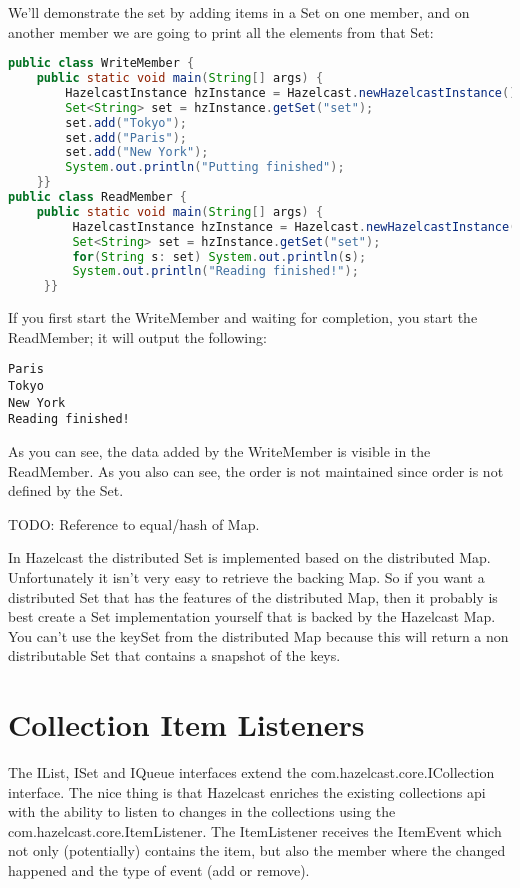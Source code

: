 We'll demonstrate the set by adding items in a Set on one member, and on another member we are going to print all the elements from that Set:
\begin{lstlisting}[language=java]
public class WriteMember {
    public static void main(String[] args) {
        HazelcastInstance hzInstance = Hazelcast.newHazelcastInstance();
        Set<String> set = hzInstance.getSet("set");
        set.add("Tokyo");
        set.add("Paris");
        set.add("New York");
        System.out.println("Putting finished");
    }}
public class ReadMember {
    public static void main(String[] args) {
         HazelcastInstance hzInstance = Hazelcast.newHazelcastInstance();
         Set<String> set = hzInstance.getSet("set");
         for(String s: set) System.out.println(s);
         System.out.println("Reading finished!");
     }}
\end{lstlisting}
If you first start the WriteMember and waiting for completion, you start the ReadMember; it will output the following:
\begin{lstlisting}
Paris
Tokyo
New York
Reading finished!	
\end{lstlisting}
As you can see, the data added by the WriteMember is visible in the ReadMember. As you also can see, the order is not maintained since order is not defined by the Set.

TODO: Reference to equal/hash of Map.

In Hazelcast the distributed Set is implemented based on the distributed Map. Unfortunately it isn't very easy to retrieve the backing Map. So if you want a distributed Set that has the features of the distributed Map, then it probably is best create a Set implementation yourself that is backed by the Hazelcast Map. You can't use the keySet from the distributed Map because this will return a non distributable Set that contains a snapshot of the keys.

\section{Collection Item Listeners}
The IList, ISet and IQueue interfaces extend the com.hazelcast.core.ICollection interface. The nice thing is that Hazelcast enriches the existing collections api with the ability to listen to changes in the collections using the com.hazelcast.core.ItemListener. The ItemListener receives the ItemEvent which not only (potentially) contains the item, but also the member where the changed happened and the type of event (add or remove).

